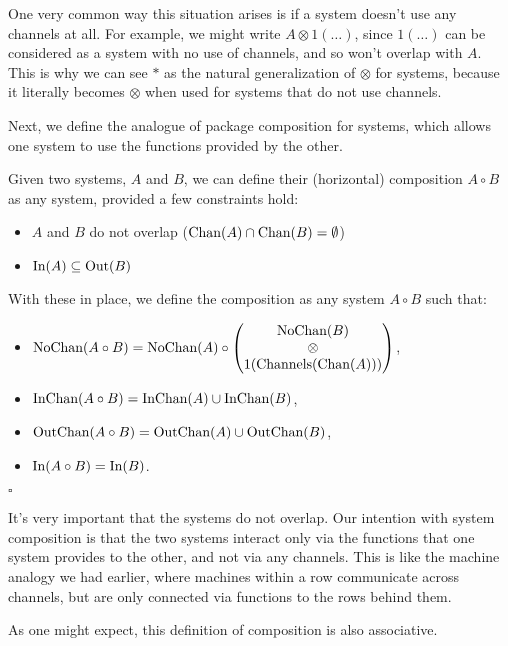 One very common way this situation arises is if a system doesn't
use any channels at all.
For example, we might write $A \otimes 1(\ldots)$,
since $1(\ldots)$ can be considered as a system with no use of channels,
and so won't overlap with $A$.
This is why we can see $*$ as the natural generalization of $\otimes$
for systems, because it literally becomes $\otimes$ when used
for systems that do not use channels.

Next, we define the analogue of package composition for systems,
which allows one system to use the functions provided by the other.

\begin{definition}
Given two systems, $A$ and $B$, we can define their (horizontal) composition
$A \circ B$ as any system, provided a few constraints hold:
\begin{itemize}
\item $A$ and $B$ do not overlap ($\text{Chan}(A) \cap \text{Chan}(B) = \emptyset$)
\item $\text{In}(A) \subseteq \text{Out}(B)$
\end{itemize}

With these in place, we define the composition as any system $A \circ B$ such that:
\begin{itemize}
  \item $\text{NoChan}(A \circ B) = \text{NoChan}(A) \circ \begin{pmatrix}
    \text{NoChan}(B)\cr
    \otimes\cr
    1(\text{Channels}(\text{Chan}(A)))
  \end{pmatrix}
    $,
  \item $\text{InChan}(A \circ B) = \text{InChan}(A) \cup \text{InChan}(B)$,
  \item $\text{OutChan}(A \circ B) = \text{OutChan}(A) \cup \text{OutChan}(B)$,
  \item $\text{In}(A \circ B) = \text{In}(B)$.
\end{itemize}

$\square$
\end{definition}

It's very important that the systems do not overlap.
Our intention with system composition is that the two systems
interact only via the functions that one system provides to the other,
and not via any channels.
This is like the machine analogy we had earlier,
where machines within a row communicate across channels,
but are only connected via functions to the rows behind them.

As one might expect, this definition of composition is also associative. 

